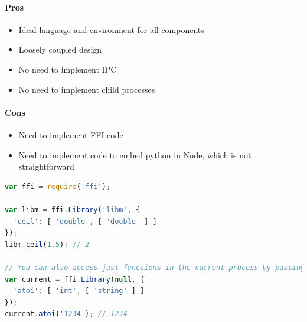\paragraph{Pros}

\begin{itemize}
  \item Ideal language and environment for all components
  \item Loosely coupled design
  \item No need to implement IPC
  \item No need to implement child processes
\end{itemize}

\paragraph{Cons}

\begin{itemize}
  \item Need to implement FFI code
  \item Need to implement code to embed python in Node, which is not straightforward
\end{itemize}

\begin{minipage}{\linewidth}

  \begin{lstlisting}[language=JavaScript, label={lst:node_ffi}, caption=Example of using \url{node-ffi} to call a C library \autocite{node-ffi}, breaklines=true]
var ffi = require('ffi');

var libm = ffi.Library('libm', {
  'ceil': [ 'double', [ 'double' ] ]
});
libm.ceil(1.5); // 2

// You can also access just functions in the current process by passing a null
var current = ffi.Library(null, {
  'atoi': [ 'int', [ 'string' ] ]
});
current.atoi('1234'); // 1234
\end{lstlisting}

\end{minipage}

